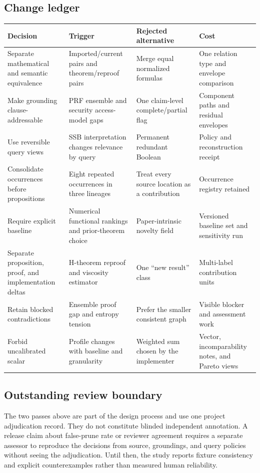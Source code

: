 \subsection{Change ledger}

\small
\begin{longtable}{>{\raggedright\arraybackslash}p{}>{\raggedright\arraybackslash}p{}>{\raggedright\arraybackslash}p{}>{\raggedright\arraybackslash}p{}}
\toprule
Decision & Trigger & Rejected alternative & Cost \\
\midrule
\endhead
Separate mathematical and semantic equivalence & Imported/current pairs and theorem/reproof pairs & Merge equal normalized formulas & One relation type and envelope comparison \\
Make grounding clause-addressable & PRF ensemble and security access-model gaps & One claim-level complete/partial flag & Component paths and residual envelopes \\
Use reversible query views & SSB interpretation changes relevance by query & Permanent redundant Boolean & Policy and reconstruction receipt \\
Consolidate occurrences before propositions & Eight repeated occurrences in three lineages & Treat every source location as a contribution & Occurrence registry retained \\
Require explicit baseline & Numerical functional rankings and prior-theorem choice & Paper-intrinsic novelty field & Versioned baseline set and sensitivity run \\
Separate proposition, proof, and implementation deltas & H-theorem reproof and viscosity estimator & One ``new result'' class & Multi-label contribution units \\
Retain blocked contradictions & Ensemble proof gap and entropy tension & Prefer the smaller consistent graph & Visible blocker and assessment work \\
Forbid uncalibrated scalar & Profile changes with baseline and granularity & Weighted sum chosen by the implementer & Vector, incomparability notes, and Pareto views \\
\bottomrule
\end{longtable}
\normalsize

\subsection{Outstanding review boundary}

The two passes above are part of the design process and use one project adjudication record. They do not constitute blinded independent annotation. A release claim about false-prune rate or reviewer agreement requires a separate assessor to reproduce the decisions from source, groundings, and query policies without seeing the adjudication. Until then, the study reports fixture consistency and explicit counterexamples rather than measured human reliability.
